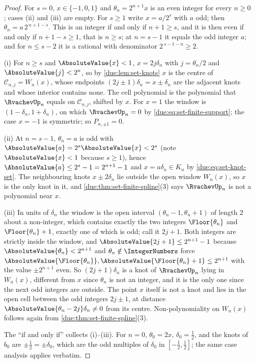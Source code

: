 \documentclass[11pt,oneside]{article}
\theoremstyle{plain}
\theoremstyle{definition}
\theoremstyle{remark}
\newcommand{\upn}[1]{\RvachevUp_{#1}}
\begin{document}
\begin{proof}
For $s=0$, $x\in\{-1,0,1\}$ and $\theta_n=2^{n+1}x$ is an even integer for
every $n\ge0$; cases (ii) and (iii) are empty.  For $s\ge1$ write
$x=a/2^{s}$ with $a$ odd; then $\theta_n=a\,2^{\,n+1-s}$.  This is an
integer if and only if $n+1\ge s$, and it is then even if and only if
$n+1-s\ge1$, that is $n\ge s$; at $n=s-1$ it equals the odd integer $a$;
and for $n\le s-2$ it is a rational with denominator $2^{\,s-1-n}\ge2$.

(i) For $n\ge s$ and $\AbsoluteValue{x}<1$, $x=2j\delta_n$ with
$j=\theta_n/2$ and $\AbsoluteValue{j}<2^{n}$, so by
\cref{due:lem:set-knots} $x$ is the centre of $\mathcal C_{n,j}=W_n(x)$,
whose endpoints $(2j\pm1)\delta_n=x\pm\delta_n$ are the adjacent knots and
whose interior contains none.  The cell polynomial is the polynomial that
$\upn{n}$ equals on $\mathcal C_{n,j}$, shifted by $x$.  For $x=1$ the
window is $(1-\delta_n,1+\delta_n)$, on which $\upn{n}=0$ by
\cref{due:eq:set-finite-support}; the case $x=-1$ is symmetric; so
$P_{n,\pm1}=0$.

(ii) At $n=s-1$, $\theta_n=a$ is odd with $\AbsoluteValue{a}=2^{s}\AbsoluteValue{x}<2^{s}$
(note $\AbsoluteValue{x}<1$ because $s\ge1$), hence
$\AbsoluteValue{a}\le2^{s}-1=2^{n+1}-1$ and $x=a\delta_n\in K_n$ by
\cref{due:eq:set-knot-set}.  The neighbouring knots $x\pm2\delta_n$ lie
outside the open window $W_n(x)$, so $x$ is the only knot in it, and
\cref{due:thm:set-finite-spline}(3) says $\upn{n}$ is not a polynomial
near $x$.

(iii) In units of $\delta_n$ the window is the open interval
$(\theta_n-1,\theta_n+1)$ of length $2$ about a non-integer, which contains
exactly the two integers $\Floor{\theta_n}$ and $\Floor{\theta_n}+1$,
exactly one of which is odd; call it $2j+1$.  Both integers are strictly
inside the window, and $\AbsoluteValue{2j+1}\le2^{n+1}-1$ because
$\AbsoluteValue{\theta_n}<2^{n+1}$ and $\theta_n\notin\IntegerNumbers$
force $\AbsoluteValue{\Floor{\theta_n}},\AbsoluteValue{\Floor{\theta_n}+1}\le2^{n+1}$
with the value $\pm2^{n+1}$ even.  So $(2j+1)\delta_n$ is a knot of
$\upn{n}$ lying in $W_n(x)$, different from $x$ since $\theta_n$ is not an
integer, and it is the only one since the next odd integers are outside.
The point $x$ itself is not a knot and lies in the open cell between the
odd integers $2j\pm1$, at distance $\AbsoluteValue{\theta_n-2j}\delta_n\ne0$
from its centre.  Non-polynomiality on $W_n(x)$ follows again from
\cref{due:thm:set-finite-spline}(3).

The ``if and only if'' collects (i)--(iii).  For $n=0$, $\theta_0=2x$,
$\delta_0=\frac12$, and the knots of $b_0$ are $\pm\frac12=\pm\delta_0$,
which are the odd multiples of $\delta_0$ in $[-\frac12,\frac12]$; the
same case analysis applies verbatim.
\end{proof}
\end{document}
